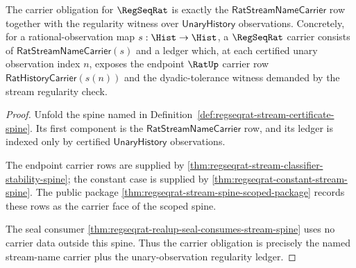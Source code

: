 \begin{theorem}
\label{thm:regseqrat-carrier-obligation}
The carrier obligation for $\RegSeqRat$ is exactly the
$\mathsf{RatStreamNameCarrier}$ row together with the regularity witness over
$\mathsf{UnaryHistory}$ observations. Concretely, for a rational-observation
map $s:\Hist\to\Hist$, a $\RegSeqRat$ carrier consists of
$\mathsf{RatStreamNameCarrier}(s)$ and a ledger which, at each certified unary
observation index $n$, exposes the endpoint $\RatUp$ carrier row
$\mathsf{RatHistoryCarrier}(s(n))$ and the dyadic-tolerance witness demanded by
the stream regularity check.
\end{theorem}
\begin{proof}
Unfold the spine named in
Definition~\ref{def:regseqrat-stream-certificate-spine}. Its first component
is the $\mathsf{RatStreamNameCarrier}$ row, and its ledger is indexed only by
certified $\mathsf{UnaryHistory}$ observations.

The endpoint carrier rows are supplied by
\autoref{thm:regseqrat-stream-classifier-stability-spine}; the constant case is
supplied by \autoref{thm:regseqrat-constant-stream-spine}. The public package
\autoref{thm:regseqrat-stream-spine-scoped-package} records these rows as the
carrier face of the scoped spine.

The seal consumer
\autoref{thm:regseqrat-realup-seal-consumes-stream-spine} uses no carrier data
outside this spine. Thus the carrier obligation is precisely the named
stream-name carrier plus the unary-observation regularity ledger.
\end{proof}


